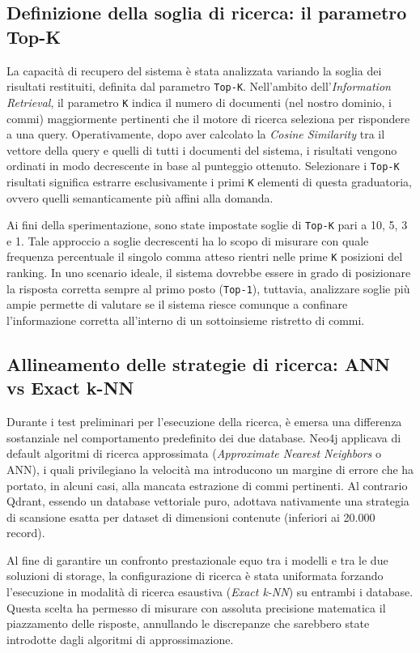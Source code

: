 \subsection{Definizione della soglia di ricerca: il parametro Top-K}
La capacità di recupero del sistema è stata analizzata variando la soglia dei risultati restituiti, definita dal parametro \texttt{Top-K}. Nell'ambito dell'\textit{Information Retrieval}, il parametro \texttt{K} indica il numero di documenti (nel nostro dominio, i commi) maggiormente pertinenti che il motore di ricerca seleziona per rispondere a una query. Operativamente, dopo aver calcolato la \textit{Cosine Similarity} tra il vettore della query e quelli di tutti i documenti del sistema, i risultati vengono ordinati in modo decrescente in base al punteggio ottenuto. Selezionare i \texttt{Top-K} risultati significa estrarre esclusivamente i primi \texttt{K} elementi di questa graduatoria, ovvero quelli semanticamente più affini alla domanda.

Ai fini della sperimentazione, sono state impostate soglie di \texttt{Top-K} pari a 10, 5, 3 e 1. Tale approccio a soglie decrescenti ha lo scopo di misurare con quale frequenza percentuale il singolo comma atteso rientri nelle prime \texttt{K} posizioni del ranking. In uno scenario ideale, il sistema dovrebbe essere in grado di posizionare la risposta corretta sempre al primo posto (\texttt{Top-1}), tuttavia, analizzare soglie più ampie permette di valutare se il sistema riesce comunque a confinare l'informazione corretta all'interno di un sottoinsieme ristretto di commi.

\subsection{Allineamento delle strategie di ricerca: ANN vs Exact k-NN}
Durante i test preliminari per l'esecuzione della ricerca, è emersa una differenza sostanziale nel comportamento predefinito dei due database. Neo4j applicava di default algoritmi di ricerca approssimata (\textit{Approximate Nearest Neighbors} o ANN), i quali privilegiano la velocità ma introducono un margine di errore che ha portato, in alcuni casi, alla mancata estrazione di commi pertinenti. Al contrario Qdrant, essendo un database vettoriale puro, adottava nativamente una strategia di scansione esatta per dataset di dimensioni contenute (inferiori ai 20.000 record).

Al fine di garantire un confronto prestazionale equo tra i modelli e tra le due soluzioni di storage, la configurazione di ricerca è stata uniformata forzando l'esecuzione in modalità di ricerca esaustiva (\textit{Exact k-NN}) su entrambi i database. Questa scelta ha permesso di misurare con assoluta precisione matematica il piazzamento delle risposte, annullando le discrepanze che sarebbero state introdotte dagli algoritmi di approssimazione.

